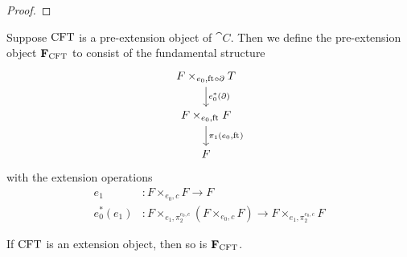 \begin{proof}
\begin{comment}
Our next subgoal is to verify that the square
\begin{equation*}
\begin{tikzcd}
\pullback%
  {\pullback{Y}{\stesysf}{g}{p\circ\eft}}%
  {\pullback{Y}{\stesysf}{g}{p\circ\eft}}%
  {g^\ast(\ectxext)}%
  {g^\ast(\eft)}
  \ar{r}{g^\ast(\efamext)} 
  \ar{d}[swap]{(g^\ast(\ectxext))^\ast(g^\ast(\ectxext))} 
  & 
\pullback{Y}{\stesysf}{g}{p\circ\eft}
  \ar{d}{g^\ast(\ectxext)}
  \\
\pullback{Y}{\stesysf}{g}{p\circ\eft}
  \ar{r}[swap]{g^\ast(\ectxext)} 
  & 
\pullback{Y}{\stesysc}{g}{p}
\end{tikzcd}
\end{equation*}
\end{comment}
\end{proof}

\begin{defn}
Suppose $\mathrm{CFT}$ is a pre-extension object of $\cat{C}$. Then we define the pre-extension object
$\mathbf{F}_{\mathrm{CFT}}$ to consist of the fundamental structure
\begin{equation*}
\begin{tikzcd}
\pullback{\stesysf}{\stesyst}{\ectxext}{\eft\circ\ebd}
  \ar{d}{\ectxext^\ast(\ebd)}
  \\
\pullback{\stesysf}{\stesysf}{\ectxext}{\eft}
  \ar{d}{\pullbackpr{1}{\ectxext}{\eft}}
  \\
\stesysf
\end{tikzcd}
\end{equation*}
with the extension operations
\begin{align*}
e_1 & : F\times_{e_0,c} F\to F\\
e_0^\ast(e_1) & : F\times_{e_1,\pi_2^{e_0,c}}(F\times_{e_0,c} F)\to F\times_{e_1,\pi_2^{e_0,c}} F
\end{align*}
\end{defn}

\begin{lem}
If $\mathrm{CFT}$ is an extension object, then so is $\mathbf{F}_{\mathrm{CFT}}$.
\end{lem}

